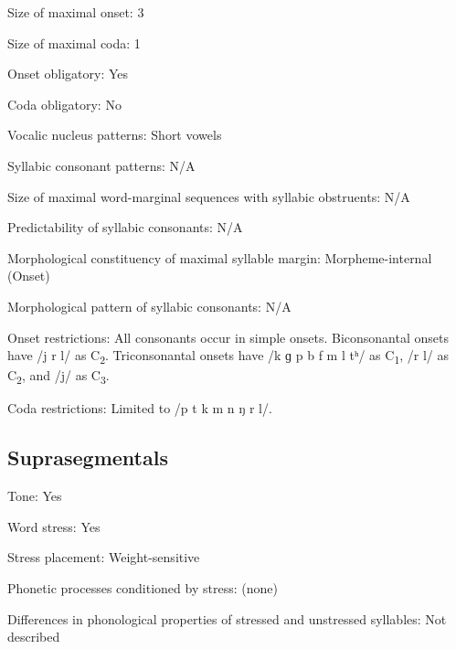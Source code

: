 {\begin{appendixdesc}
\item[Size of maximal onset:] 3

\item[Size of maximal coda:] 1

\item[Onset obligatory:] Yes

\item[Coda obligatory:] No

\item[Vocalic nucleus patterns:] Short vowels

\item[Syllabic consonant patterns:] N/A

\item[Size of maximal word-marginal sequences with syllabic obstruents:] N/A

\item[Predictability of syllabic consonants:] N/A

\item[Morphological constituency of maximal syllable margin:] Morpheme-internal (Onset)

\item[Morphological pattern of syllabic consonants:] N/A

\item[Onset restrictions:] All consonants occur in simple onsets. Biconsonantal onsets have /j r l/ as C\textsubscript{2}. Triconsonantal onsets have /k ɡ p b f m l tʰ/ as C\textsubscript{1}, /r l/ as C\textsubscript{2}, and /j/ as C\textsubscript{3}.

\item[Coda restrictions:] Limited to /p t k m n ŋ r l/.
\end{appendixdesc}
\subsection*{Suprasegmentals}
\begin{appendixdesc}
\item[Tone:] Yes

\item[Word stress:] Yes

\item[Stress placement:] Weight-sensitive

\item[Phonetic processes conditioned by stress:] (none)

\item[Differences in phonological properties of stressed and unstressed syllables:] Not described


\end{appendixdesc}}
